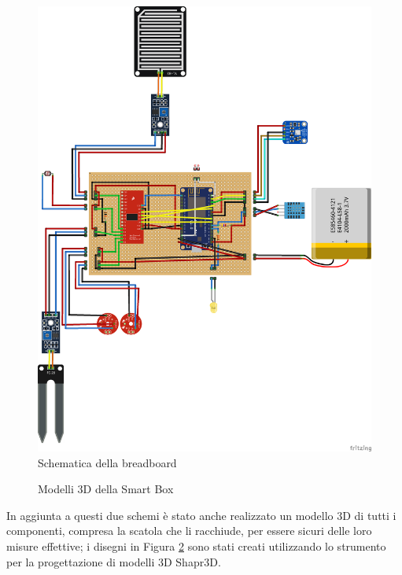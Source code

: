 \documentclass[fleqn, 12pt]{SelfArx}
\begin{document}
\begin{figure}[htb]
\centering
\includegraphics[scale=0.25]{hardware/iot_project_bb.png}
\caption{Schematica della breadboard}
\label{fig:breadboard}
\end{figure}

\begin{figure}[htb]
  \centering
  \caption{Modelli 3D della Smart Box}
  \label{fig:models}
\end{figure}

In aggiunta a questi due schemi è stato anche realizzato un modello 3D di tutti i componenti, compresa la scatola che li racchiude, per essere sicuri delle loro misure effettive; 
i disegni in Figura \ref{fig:models} sono stati creati utilizzando lo strumento per la progettazione di modelli 3D Shapr3D\cite{shapr3d}. 
\end{document}
